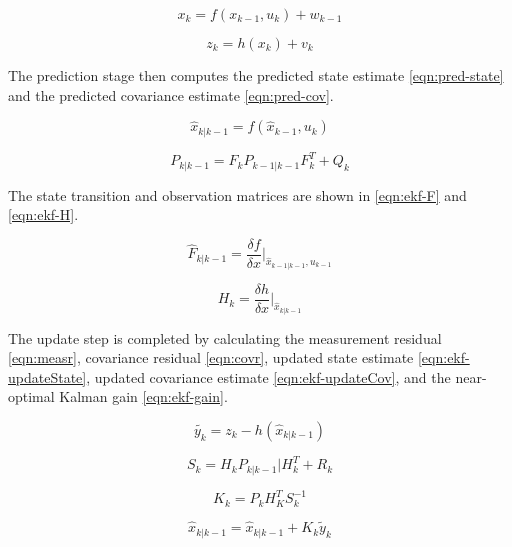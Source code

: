 \documentclass[12pt,twocolumn,letterpaper]{article}
\begin{document}
\begin{equation}
x_k = f(x_{k-1}, u_k) + w_{k-1}
\label{eqn:ekf-state}
\end{equation}

\begin{equation}
z_k = h(x_k) + v_k
\label{eqn:ekf-obs}
\end{equation}

The prediction stage then computes the predicted state estimate \ref{eqn:pred-state} and the predicted covariance estimate \ref{eqn:pred-cov}.

\begin{equation}
\hat{x}_{k|k-1} = f(\hat{x}_{k-1}, u_k)
\label{eqn:pred-state}
\end{equation}

\begin{equation}
P_{k|k-1} = F_kP_{k-1|k-1}F_k^T + Q_k
\label{eqn:pred-cov}
\end{equation}

The state transition and observation matrices are shown in \ref{eqn:ekf-F} and \ref{eqn:ekf-H}.

\begin{equation}
\hat{F}_{k|k-1} = \frac{\delta f}{\delta x}\Bigr|_{\hat{x}_{k-1|k-1}, u_{k-1}}
\label{eqn:ekf-F}
\end{equation}

\begin{equation}
H_{k} = \frac{\delta h}{\delta x}\Bigr|_{\hat{x}_{k|k-1}}
\label{eqn:ekf-H}
\end{equation}

The update step is completed by calculating the measurement residual \ref{eqn:measr}, covariance residual \ref{eqn:covr}, updated state estimate \ref{eqn:ekf-updateState}, updated covariance estimate \ref{eqn:ekf-updateCov}, and the near-optimal Kalman gain \ref{eqn:ekf-gain}.

\begin{equation}
\tilde{y_k} = z_k -h(\hat{x}_{k|k-1})
\label{eqn:measr}
\end{equation}

\begin{equation}
S_k = H_kP_{k|k-1}|H_k^T + R_k
\label{eqn:covr}
\end{equation}

\begin{equation}
K_k = P_{k}H_K^TS_k^{-1}
\label{eqn:ekf-gain}
\end{equation}

\begin{equation}
\hat{x}_{k|k-1} = \hat{x}_{k|k-1} + K_k\tilde{y}_k
\label{eqn:ekf-updateState}
\end{equation}
\end{document}
